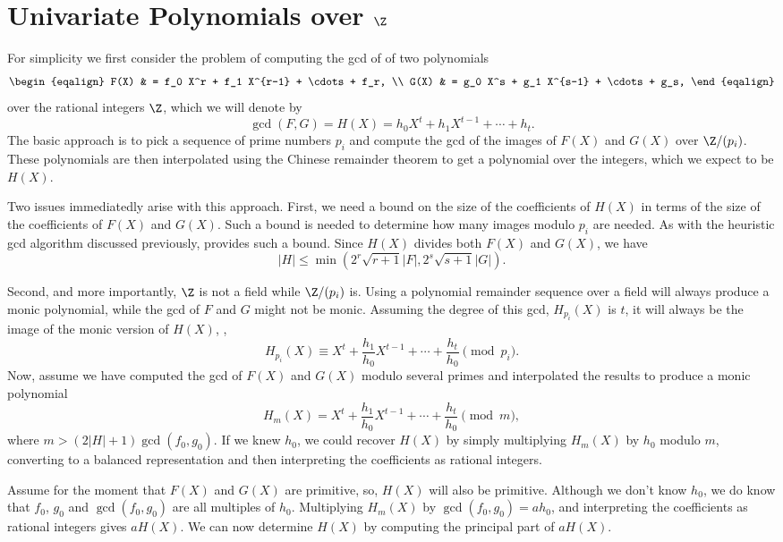 \section{Univariate Polynomials over $\Z$}
\label{PGCD:Uni:Sec}

For simplicity we first consider the problem of computing the {\sc gcd} of
of two polynomials 
\[
\begin{eqalign}
F(X) & = f_0 X^r + f_1 X^{r-1} + \cdots + f_r, \\
G(X) & = g_0 X^s + g_1 X^{s-1} + \cdots + g_s, 
\end{eqalign}
\]
over the rational integers $\Z$,
which we will denote by
\[
\gcd(F, G) = H(X) = h_0 X^t + h_1 X^{t-1} + \cdots + h_t.
\]  The basic approach is to pick a
sequence of prime numbers $p_i$ and compute the {\sc gcd} of the images of
$F(X)$ and $G(X)$ over $\Z/(p_i)$.  These polynomials are then
interpolated using the Chinese remainder theorem to get a polynomial
over the integers, which we expect to be $H(X)$. 

Two issues immediatedly arise with this approach.  First, we need a
bound on the size of the coefficients of $H(X)$ in terms of the size
of the coefficients of $F(X)$ and $G(X)$.  Such a bound is needed to
determine how many images modulo $p_i$ are needed.  As with the
heuristic {\sc gcd} algorithm discussed previously, 
 provides such a bound.  Since $H(X)$
divides both $F(X)$ and $G(X)$, we have
\[
|H| \le \min( 2^r\sqrt{r+1} |F|, 2^s\sqrt{s+1} |G|).
\]

Second, and more importantly, $\Z$ is not a field while $\Z/(p_i)$ is.
Using a polynomial remainder sequence over a field will always produce
a monic polynomial, while the {\sc gcd} of $F$ and $G$ might not be monic.
Assuming the degree of this {\sc gcd}, $H_{p_i}(X)$ is $t$, it will always
be the image of the monic version of $H(X)$, \ie,
\[
H_{p_i}(X) \equiv X^t + \frac{h_1}{h_0} X^{t-1} + \cdots + \frac{h_t}{h_0}
    \pmod{p_i}.
\]
Now, assume we have computed the {\sc gcd} of $F(X)$ and $G(X)$ modulo
several primes and interpolated the results to produce a monic
polynomial
\[
H_m(X) = X^t + \frac{h_1}{h_0} X^{t-1} + \cdots + \frac{h_t}{h_0} \pmod{m},
\]
where $m > (2 |H| + 1) \gcd(f_0, g_0)$.  If we knew $h_0$, we could
recover $H(X)$ by simply multiplying $H_m(X)$ by $h_0$ modulo $m$,
converting to a balanced representation and then interpreting the
coefficients as rational integers.

Assume for the moment that $F(X)$ and $G(X)$ are primitive, so, $H(X)$
will also be primitive.  Although we don't know $h_0$, we do know that
$f_0$, $g_0$ and $\gcd(f_0, g_0)$ are all multiples of $h_0$.
Multiplying $H_m(X)$ by $\gcd(f_0, g_0) = a h_0$, and interpreting the
coefficients as rational integers gives $aH(X)$.  We can now determine
$H(X)$ by computing the principal part of $aH(X)$.

